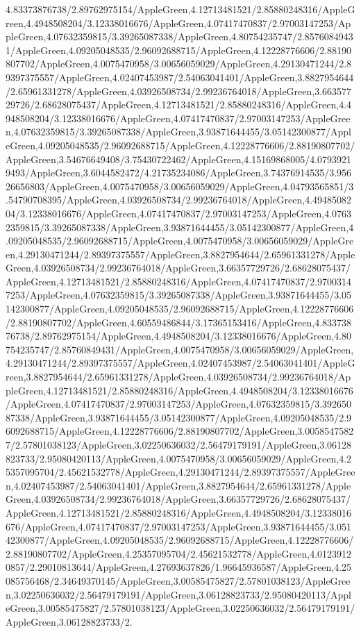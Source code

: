 {\begin{tikzternal}
{4.83373876738/2.89762975154/AppleGreen,4.12713481521/2.85880248316/AppleGreen,4.4948508204/3.12338016676/AppleGreen,4.07417470837/2.97003147253/AppleGreen,4.07632359815/3.39265087338/AppleGreen,4.80754235747/2.85760849431/AppleGreen,4.09205048535/2.96092688715/AppleGreen,4.12228776606/2.88190807702/AppleGreen,4.0075470958/3.00656059029/AppleGreen,4.29130471244/2.89397375557/AppleGreen,4.02407453987/2.54063041401/AppleGreen,3.8827954644/2.65961331278/AppleGreen,4.03926508734/2.99236764018/AppleGreen,3.66357729726/2.68628075437/AppleGreen,4.12713481521/2.85880248316/AppleGreen,4.4948508204/3.12338016676/AppleGreen,4.07417470837/2.97003147253/AppleGreen,4.07632359815/3.39265087338/AppleGreen,3.93871644455/3.05142300877/AppleGreen,4.09205048535/2.96092688715/AppleGreen,4.12228776606/2.88190807702/AppleGreen,3.54676649408/3.75430722462/AppleGreen,4.15169868005/4.07939219493/AppleGreen,3.6044582472/4.21735234086/AppleGreen,3.74376914535/3.95626656803/AppleGreen,4.0075470958/3.00656059029/AppleGreen,4.04793565851/3.54790708395/AppleGreen,4.03926508734/2.99236764018/AppleGreen,4.4948508204/3.12338016676/AppleGreen,4.07417470837/2.97003147253/AppleGreen,4.07632359815/3.39265087338/AppleGreen,3.93871644455/3.05142300877/AppleGreen,4.09205048535/2.96092688715/AppleGreen,4.0075470958/3.00656059029/AppleGreen,4.29130471244/2.89397375557/AppleGreen,3.8827954644/2.65961331278/AppleGreen,4.03926508734/2.99236764018/AppleGreen,3.66357729726/2.68628075437/AppleGreen,4.12713481521/2.85880248316/AppleGreen,4.07417470837/2.97003147253/AppleGreen,4.07632359815/3.39265087338/AppleGreen,3.93871644455/3.05142300877/AppleGreen,4.09205048535/2.96092688715/AppleGreen,4.12228776606/2.88190807702/AppleGreen,4.60559486844/3.17365153416/AppleGreen,4.83373876738/2.89762975154/AppleGreen,4.4948508204/3.12338016676/AppleGreen,4.80754235747/2.85760849431/AppleGreen,4.0075470958/3.00656059029/AppleGreen,4.29130471244/2.89397375557/AppleGreen,4.02407453987/2.54063041401/AppleGreen,3.8827954644/2.65961331278/AppleGreen,4.03926508734/2.99236764018/AppleGreen,4.12713481521/2.85880248316/AppleGreen,4.4948508204/3.12338016676/AppleGreen,4.07417470837/2.97003147253/AppleGreen,4.07632359815/3.39265087338/AppleGreen,3.93871644455/3.05142300877/AppleGreen,4.09205048535/2.96092688715/AppleGreen,4.12228776606/2.88190807702/AppleGreen,3.00585475827/2.57801038123/AppleGreen,3.02250636032/2.56479179191/AppleGreen,3.06128823733/2.95080420113/AppleGreen,4.0075470958/3.00656059029/AppleGreen,4.25357095704/2.45621532778/AppleGreen,4.29130471244/2.89397375557/AppleGreen,4.02407453987/2.54063041401/AppleGreen,3.8827954644/2.65961331278/AppleGreen,4.03926508734/2.99236764018/AppleGreen,3.66357729726/2.68628075437/AppleGreen,4.12713481521/2.85880248316/AppleGreen,4.4948508204/3.12338016676/AppleGreen,4.07417470837/2.97003147253/AppleGreen,3.93871644455/3.05142300877/AppleGreen,4.09205048535/2.96092688715/AppleGreen,4.12228776606/2.88190807702/AppleGreen,4.25357095704/2.45621532778/AppleGreen,4.01239120857/2.29010813644/AppleGreen,4.27693637826/1.96645936587/AppleGreen,4.25085756468/2.34649370145/AppleGreen,3.00585475827/2.57801038123/AppleGreen,3.02250636032/2.56479179191/AppleGreen,3.06128823733/2.95080420113/AppleGreen,3.00585475827/2.57801038123/AppleGreen,3.02250636032/2.56479179191/AppleGreen,3.06128823733/2.}
\end{tikzternal}}
